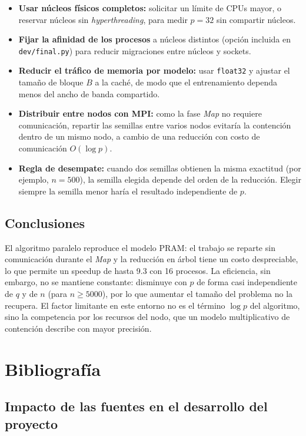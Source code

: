 \documentclass[11pt, a4paper]{article}
\begin{document}
\begin{itemize}
    \item \textbf{Usar núcleos físicos completos:} solicitar un límite de CPUs mayor, o reservar núcleos sin \textit{hyperthreading}, para medir $p = 32$ sin compartir núcleos.
    \item \textbf{Fijar la afinidad de los procesos} a núcleos distintos (opción incluida en \texttt{dev/final.py}) para reducir migraciones entre núcleos y sockets.
    \item \textbf{Reducir el tráfico de memoria por modelo:} usar \texttt{float32} y ajustar el tamaño de bloque $B$ a la caché, de modo que el entrenamiento dependa menos del ancho de banda compartido.
    \item \textbf{Distribuir entre nodos con MPI:} como la fase \textit{Map} no requiere comunicación, repartir las semillas entre varios nodos evitaría la contención dentro de un mismo nodo, a cambio de una reducción con costo de comunicación $O(\log p)$.
    \item \textbf{Regla de desempate:} cuando dos semillas obtienen la misma exactitud (por ejemplo, $n = 500$), la semilla elegida depende del orden de la reducción. Elegir siempre la semilla menor haría el resultado independiente de $p$.
\end{itemize}

\subsection{Conclusiones}

El algoritmo paralelo reproduce el modelo PRAM: el trabajo se reparte sin comunicación durante el \textit{Map} y la reducción en árbol tiene un costo despreciable, lo que permite un speedup de hasta 9.3 con 16 procesos. La eficiencia, sin embargo, no se mantiene constante: disminuye con $p$ de forma casi independiente de $q$ y de $n$ (para $n \geq 5000$), por lo que aumentar el tamaño del problema no la recupera. El factor limitante en este entorno no es el término $\log p$ del algoritmo, sino la competencia por los recursos del nodo, que un modelo multiplicativo de contención describe con mayor precisión.

\section{Bibliografía}

\subsection*{Impacto de las fuentes en el desarrollo del proyecto}
\end{document}
